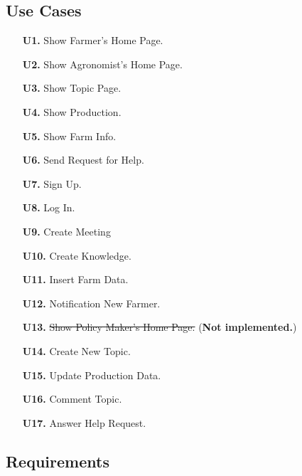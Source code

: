 \subsection{Use Cases}

\begin{enumerate}
	\item [\textbf{U1.}] Show Farmer's Home Page.
	\item [\textbf{U2.}] Show Agronomist's Home Page.
	\item [\textbf{U3.}] Show Topic Page.
	\item [\textbf{U4.}] Show Production.
	\item [\textbf{U5.}] Show Farm Info.
	\item [\textbf{U6.}] Send Request for Help.
	\item [\textbf{U7.}] Sign Up.
	\item [\textbf{U8.}] Log In.
	\item [\textbf{U9.}] Create Meeting
	\item [\textbf{U10.}] Create Knowledge.
	\item [\textbf{U11.}] Insert Farm Data.
	\item [\textbf{U12.}] Notification New Farmer.
	\item [\textbf{U13.}] \sout{Show Policy Maker's Home Page.} (\textbf{Not implemented.})
	\item [\textbf{U14.}] Create New Topic.
	\item [\textbf{U15.}] Update Production Data.
	\item [\textbf{U16.}] Comment Topic.
	\item [\textbf{U17.}] Answer Help Request.
\end{enumerate}

\subsection{Requirements}

